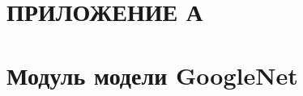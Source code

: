 \section*{ПРИЛОЖЕНИЕ А}
\section*{Модуль модели GoogleNet}
\setcounter{lstlisting}{0}
\renewcommand{\thelstlisting}{A.\arabic{lstlisting}} %




\pagebreak